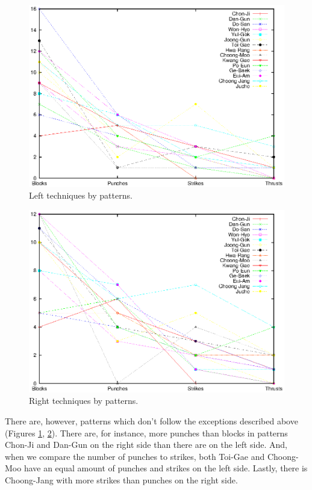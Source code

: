 \documentclass[10pt,twocolumn,a4paper]{article}
\begin{document}
  \begin{figure}
    \includegraphics[scale=0.72]{data/gnuplot/eps/patterns_left}
    \caption{Left techniques by patterns.}
    \label{fig:patterns_left}
  \end{figure}

  \begin{figure}
    \includegraphics[scale=0.72]{data/gnuplot/eps/patterns_right}
    \caption{Right techniques by patterns.}
    \label{fig:patterns_right}
  \end{figure}

  There are, however, patterns which don't follow the exceptions described
  above (Figures \ref{fig:patterns_left}, \ref{fig:patterns_right}). There
  are, for instance, more punches than blocks in patterns Chon-Ji and Dan-Gun
  on the right side than there are on the left side. And, when we compare the
  number of punches to strikes, both Toi-Gae and Choong-Moo have an equal
  amount of punches and strikes on the left side. Lastly, there is Choong-Jang
  with more strikes than punches on the right side.
\end{document}
